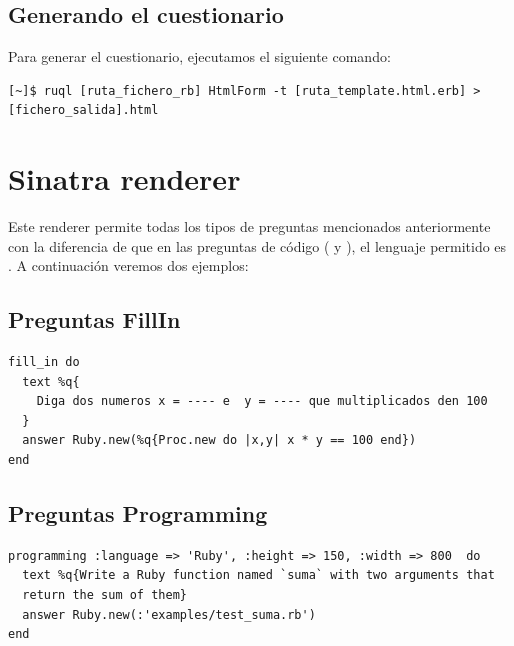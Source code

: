 \subsection{Generando el cuestionario}
\label{subsec:Apendice2.10}

Para generar el cuestionario, ejecutamos el siguiente comando:
\begin{verbatim}
[~]$ ruql [ruta_fichero_rb] HtmlForm -t [ruta_template.html.erb] > [fichero_salida].html
\end{verbatim}

\section{Sinatra renderer}
\label{Apendice2:sinatra}

Este renderer permite todas los tipos de preguntas mencionados anteriormente con la diferencia de que en las preguntas de c\'odigo ( y ), 
el lenguaje permitido es . A continuaci\'on veremos dos ejemplos:

\subsection{Preguntas FillIn}
\label{subsec:Apendice2.11}

\begin{verbatim}
fill_in do
  text %q{
    Diga dos numeros x = ---- e  y = ---- que multiplicados den 100
  }
  answer Ruby.new(%q{Proc.new do |x,y| x * y == 100 end})
end
\end{verbatim}

\subsection{Preguntas Programming}
\label{subsec:Apendice2.11}

\begin{verbatim}
programming :language => 'Ruby', :height => 150, :width => 800  do
  text %q{Write a Ruby function named `suma` with two arguments that 
  return the sum of them}
  answer Ruby.new(:'examples/test_suma.rb')
end
\end{verbatim}

